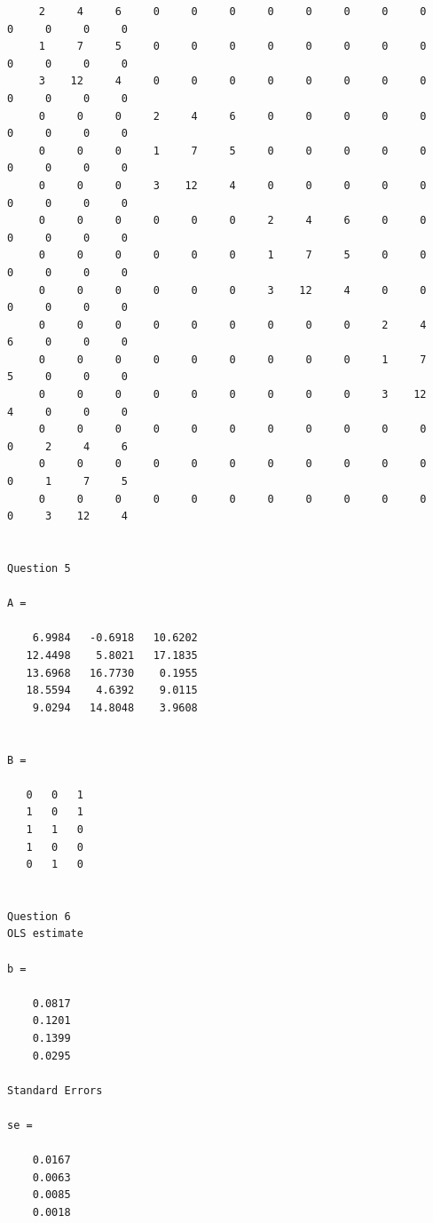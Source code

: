 \documentclass[12pt]{article}
\begin{document}
\begin{verbatim}
     2     4     6     0     0     0     0     0     0     0     0     0     0     0     0
     1     7     5     0     0     0     0     0     0     0     0     0     0     0     0
     3    12     4     0     0     0     0     0     0     0     0     0     0     0     0
     0     0     0     2     4     6     0     0     0     0     0     0     0     0     0
     0     0     0     1     7     5     0     0     0     0     0     0     0     0     0
     0     0     0     3    12     4     0     0     0     0     0     0     0     0     0
     0     0     0     0     0     0     2     4     6     0     0     0     0     0     0
     0     0     0     0     0     0     1     7     5     0     0     0     0     0     0
     0     0     0     0     0     0     3    12     4     0     0     0     0     0     0
     0     0     0     0     0     0     0     0     0     2     4     6     0     0     0
     0     0     0     0     0     0     0     0     0     1     7     5     0     0     0
     0     0     0     0     0     0     0     0     0     3    12     4     0     0     0
     0     0     0     0     0     0     0     0     0     0     0     0     2     4     6
     0     0     0     0     0     0     0     0     0     0     0     0     1     7     5
     0     0     0     0     0     0     0     0     0     0     0     0     3    12     4


Question 5

A =

    6.9984   -0.6918   10.6202
   12.4498    5.8021   17.1835
   13.6968   16.7730    0.1955
   18.5594    4.6392    9.0115
    9.0294   14.8048    3.9608


B =

   0   0   1
   1   0   1
   1   1   0
   1   0   0
   0   1   0


Question 6
OLS estimate

b =

    0.0817
    0.1201
    0.1399
    0.0295

Standard Errors

se =

    0.0167
    0.0063
    0.0085
    0.0018

\end{verbatim}
\end{document}
